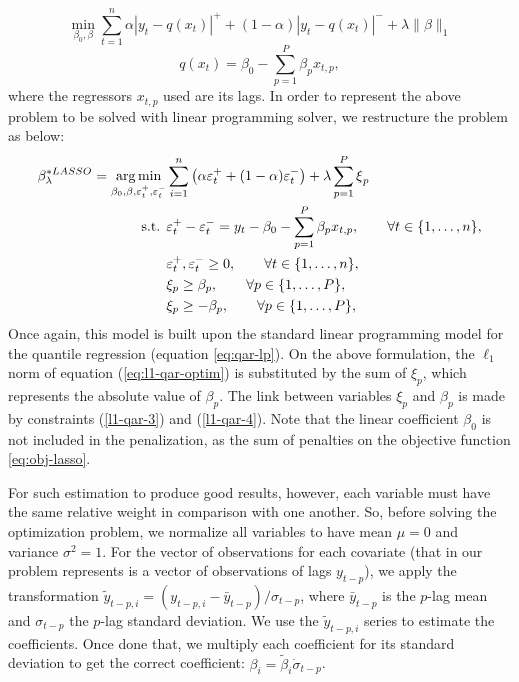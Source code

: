 \begin{equation}
\min_{\beta_{0},\beta}\sum_{t=1}^{n}\alpha|y_{t}-q(x_t)|^{+}+(1-\alpha)|y_{t}-q(x_t)|^{-}+\lambda\|\beta\|_{1}
\label{eq:l1-qar-optim}
\end{equation}
\[
q(x_t)=\beta_{0}-\sum_{p=1}^{P}\beta_{p}x_{t,p},
\]
where the regressors $x_{t,p}$ used are its lags. In order to represent the above problem to be solved with linear programming solver, we restructure the problem as below:
\begin{eqnarray}
\beta_\lambda^{*LASSO} = \operatorname*{arg\,min}_{\beta_{0},\beta,\varepsilon_{t}^{+},\varepsilon_{t}^{-}} & \sum_{i=1}^{n}\left(\alpha\varepsilon_{t}^{+}+(1-\alpha)\varepsilon_{t}^{-}\right)+\lambda\sum_{p=1}^{P}\mbox{\ensuremath{\xi}}_{p} \label{eq:obj-lasso} \\
\mbox{s.t. } & \varepsilon_{t}^{+}-\varepsilon_{t}^{-}=y_{t}-\beta_{0}-\sum_{p=1}^{P}\beta_{p}x_{t,p},\qquad\forall t\in\{1,\dots,n\},\\
 & \varepsilon_{t}^{+},\varepsilon_{t}^{-}\geq0,\qquad\forall t \in \{1,\dots,n\},\\
 & \xi_{p}\geq\beta_{p},\qquad\forall p\in\{1,\dots,P\}, \label{l1-qar-3}\\
 & \xi_{p}\geq-\beta_{p},\qquad\forall p\in\{1,\dots,P\}, \label{l1-qar-4}
\end{eqnarray}
Once again, this model is built upon the standard linear programming model for the quantile regression (equation \ref{eq:qar-lp}). 
On the above formulation, the $\ell_1$ norm of equation (\ref{eq:l1-qar-optim}) is substituted by the sum of $\xi_p$, which represents the absolute value of $\beta_p$. The link between variables $\xi_p$ and $\beta_p$ is made by constraints (\ref{l1-qar-3}) and (\ref{l1-qar-4}). Note that the linear coefficient $\beta_0$ is not included in the penalization, as the sum of penalties on the objective function \ref{eq:obj-lasso}.

For such estimation to produce good results, however, each variable must have the same relative weight in comparison with one another. So, before solving the optimization problem, we normalize all variables to have mean $\mu = 0$ and variance $\sigma^2 = 1$. For the vector of observations for each covariate (that in our problem represents is a vector of observations of lags $y_{t-p}$), we apply the transformation $\tilde{y}_{t-p,i} = (y_{t-p,i} - \bar{y}_{t-p}) / \sigma_{t-p}$, where $\bar{y}_{t-p}$ is the $p$-lag mean and $\sigma_{t-p}$ the $p$-lag standard deviation. We use the $\tilde{y}_{t-p,i}$ series to estimate the coefficients. Once done that, we multiply each coefficient for its standard deviation to get the correct coefficient: $\beta_i = \tilde{\beta}_i \dot \sigma_{t-p}$.

